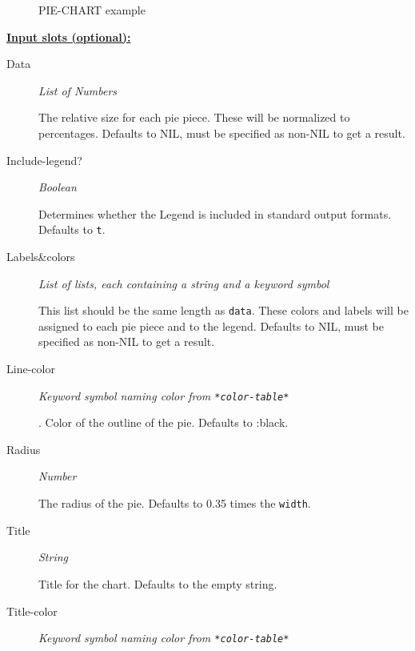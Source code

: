 \documentclass [11pt]{book}
\begin{document}
\begin{itemize}
\begin{figure}
\caption{PIE-CHART example}

\label{fig:PIE-CHART}

\end{figure}





\textbf{
\underline{Input slots (optional):}}

\begin{description}

\item [Data]
\emph{List of Numbers}

 The relative size for each pie piece. These will be normalized to percentages.
Defaults to NIL, must be specified as non-NIL to get a result.




\item [Include-legend?]
\emph{Boolean}

 Determines whether the Legend is included in standard output formats. Defaults to \texttt{t}.




\item [Labels&colors]
\emph{List of lists, each containing a string and a keyword symbol}

 This list should be the same
length as \texttt{data}. These colors and labels will be assigned to each pie piece and to the legend.
Defaults to NIL, must be specified as non-NIL to get a result.




\item [Line-color]
\emph{Keyword symbol naming color from \texttt{*color-table*}}

.
Color of the outline of the pie. Defaults to :black.




\item [Radius]
\emph{Number}

 The radius of the pie. Defaults to 0.35 times the \texttt{width}.




\item [Title]
\emph{String}

 Title for the chart. Defaults to the empty string.




\item [Title-color]
\emph{Keyword symbol naming color from \texttt{*color-table*}}


\end{description}
\end{itemize}
\end{document}
